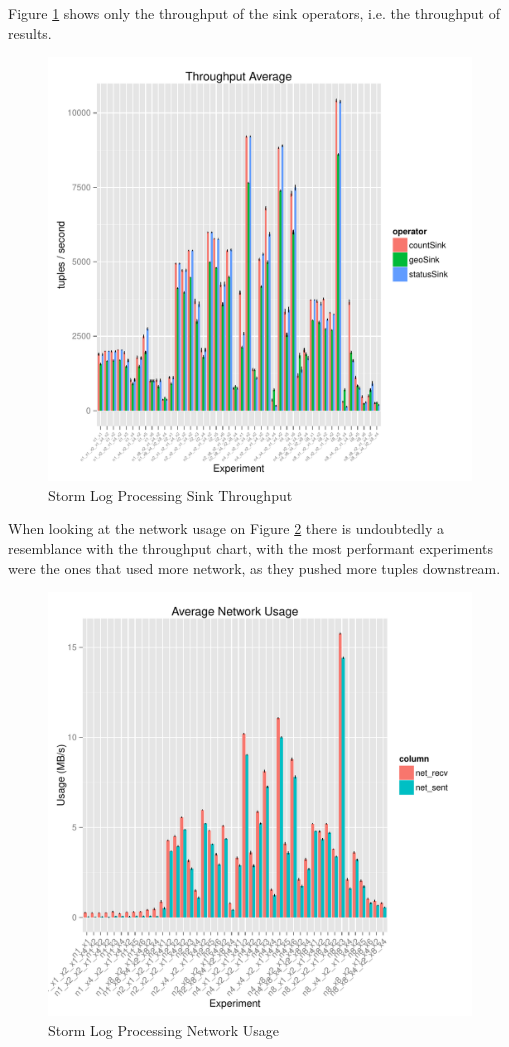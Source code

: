 \documentclass[ppgc,diss,english]{iiufrgs}
\begin{document}
Figure \ref{fig:storm_logprocessing_sink_throughput} shows only the throughput of the sink operators, i.e. the throughput of results.

\begin{figure}[H]
    \centering
	\includegraphics[width=.6\textwidth]{summaries/storm_logprocessing/sink_throughput.pdf}
	\caption{Storm Log Processing Sink Throughput}
	\label{fig:storm_logprocessing_sink_throughput}
\end{figure}

When looking at the network usage on Figure \ref{fig:storm_logprocessing_network} there is undoubtedly a resemblance with the throughput chart, with the most performant experiments were the ones that used more network, as they pushed more tuples downstream.

\begin{figure}[H]
    \centering
	\includegraphics[width=.6\textwidth]{summaries/storm_logprocessing/full_network.pdf}
	\caption{Storm Log Processing Network Usage}
	\label{fig:storm_logprocessing_network}
\end{figure}
\end{document}
